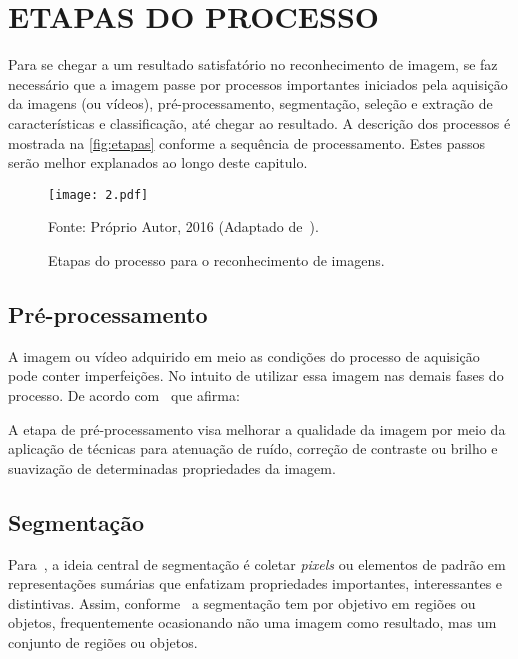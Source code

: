 \section{\uppercase{Etapas do Processo}}

Para se chegar a um resultado satisfatório no reconhecimento de imagem, se faz necessário que a imagem passe por processos importantes iniciados pela aquisição da imagens (ou vídeos), pré-processamento, segmentação, seleção e extração de características e classificação, até chegar ao resultado. A descrição dos processos é mostrada na \autoref{fig:etapas} conforme a sequência de processamento. Estes passos serão melhor explanados ao longo deste capitulo.

\begin{figure}[htb]
	\centering
	\caption{{\footnotesize Etapas do processo para o reconhecimento de imagens.}}   %
	\label{fig:etapas}
	\texttt{[image: 2.pdf]}
	
	{\footnotesize Fonte: Próprio Autor, 2016 (Adaptado de~\cite{juliana2016}).}
\end{figure}

\subsection{\textbf{Pré-processamento}}

A imagem ou vídeo adquirido em meio as condições do processo de aquisição pode conter imperfeições. No intuito de utilizar essa imagem nas demais fases do processo. De acordo com~\cite{pedrini2017} que afirma:

\begin{citacao}
	
	A etapa de pré-processamento visa melhorar a qualidade da imagem por meio da aplicação de técnicas para atenuação de ruído, correção de contraste ou brilho e suavização de determinadas propriedades da imagem.
	
\end{citacao}
	 

\subsection{\textbf{Segmentação}}

Para~, a ideia central de segmentação é coletar \emph{pixels} ou elementos de padrão em representações sumárias que enfatizam propriedades importantes, interessantes e distintivas. Assim, conforme~ a segmentação tem por objetivo em regiões ou objetos, frequentemente ocasionando não uma imagem como resultado, mas um conjunto de regiões ou objetos.

